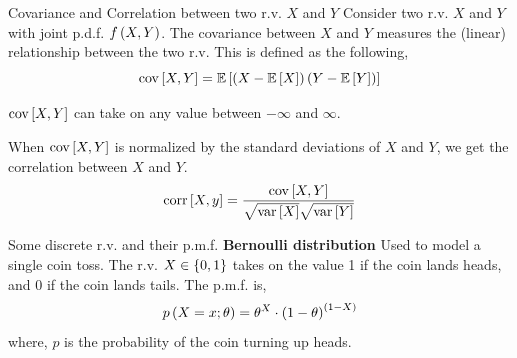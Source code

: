 \documentclass[aspectratio=169]{beamer}
\def\mb{\ensuremath\mathbb}
\def\lp{\ensuremath\left(}
\def\rp{\ensuremath\right)}
\def\lc{\ensuremath\left\{}
\def\rc{\ensuremath\right\}}
\def\ls{\ensuremath\left[}
\def\rs{\ensuremath\right]}
\newcommand{\ct}[1]{\lp #1\rp}
\newcommand{\dt}[1]{\ls #1\rs}
\begin{document}
\begin{frame}{Covariance and Correlation between two r.v. $X$ and $Y$}
  Consider two r.v. $X$ and $Y$ with joint p.d.f. $f\ct{X, Y}$. The covariance between $X$ and $Y$ measures the (linear) relationship between the two r.v. This is defined as the following,
  \[ \mathrm{cov}\dt{X, Y} = \mb{E}\dt{\ct{X - \mb{E}\dt{X}}\ct{Y - \mb{E}\dt{Y}}} \]
  \vspace{0.05cm}
  
  $\mathrm{cov}\dt{X, Y}$ can take on any value between $-\infty$ and $\infty$. 
  \vspace{0.4cm}
  
  When $\mathrm{cov}\dt{X, Y}$ is normalized by the standard deviations of $X$ and $Y$, we get the correlation between $X$ and $Y$.
  \[ \mathrm{corr}\dt{X, y} = \frac{\mathrm{cov}\dt{X, Y}}{\sqrt{\mathrm{var}\dt{X}} \sqrt{\mathrm{var}\dt{Y}}} \] 
\end{frame}


\begin{frame}{Some discrete r.v. and their p.m.f.}
  \textbf{Bernoulli distribution} Used to model a single coin toss. The r.v. $X \in \lc 0, 1\rc$ takes on the value 1 if the coin lands heads, and 0 if the coin lands tails. The p.m.f. is,
  \[ p\ct{X = x; \theta} = \theta^X \cdot \ct{1 - \theta}^{\ct{1 - X}} \]
  where, $p$ is the probability of the coin turning up heads.
  \vspace{0.25cm}
  \begin{center}
  \end{center}
\end{frame}
\end{document}
